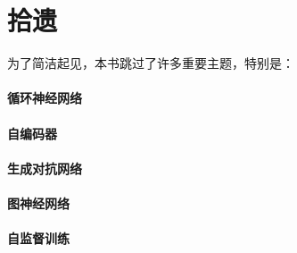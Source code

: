 
\chapter*{拾遗}

为了简洁起见，本书跳过了许多重要主题，特别是：

\subsubsection*{循环神经网络}

\subsubsection*{自编码器}

\subsubsection*{生成对抗网络}

\subsubsection*{图神经网络}

\subsubsection*{自监督训练}